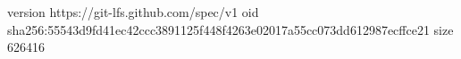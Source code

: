 version https://git-lfs.github.com/spec/v1
oid sha256:55543d9fd41ec42ccc3891125f448f4263e02017a55cc073dd612987ecffce21
size 626416
